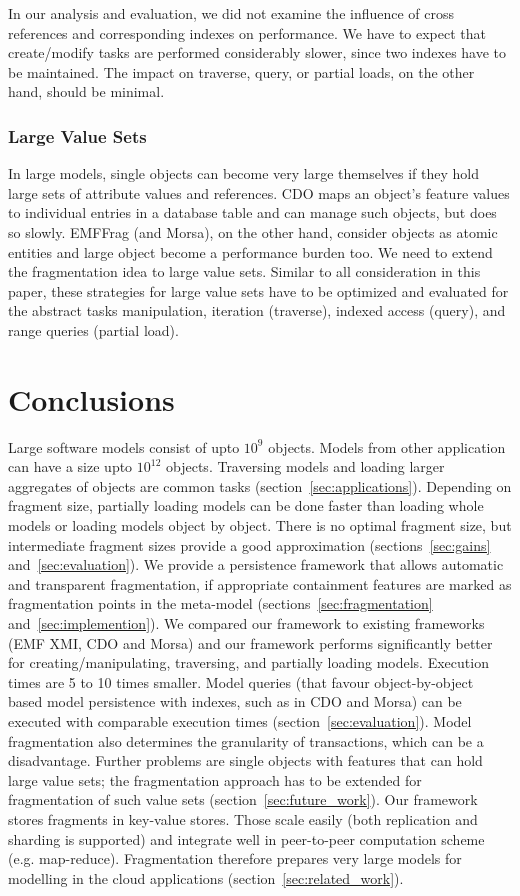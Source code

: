 In our analysis and evaluation, we did not examine the influence of cross references and corresponding indexes on performance. We have to expect that create/modify tasks are performed considerably slower, since two indexes have to be maintained. The impact on traverse, query, or partial loads, on the other hand, should be minimal.

\subsubsection{Large Value Sets}

In large models, single objects can become very large themselves if they hold large sets of attribute values and references. CDO maps an object's feature values to individual entries in a database table and can manage such objects, but does so slowly. EMFFrag (and Morsa), on the other hand, consider objects as atomic entities and large object become a performance burden too. We need to extend the fragmentation idea to large value sets. Similar to all consideration in this paper, these strategies for large value sets have to be optimized and evaluated for the abstract tasks manipulation, iteration (traverse), indexed access (query), and range queries (partial load). 

\section{Conclusions}\label{sec:conclusions}

Large software models consist of upto $10^9$ objects. Models from other application can have a size upto $10^{12}$ objects. Traversing models and loading larger aggregates of objects are common tasks (section~\ref{sec:applications}). Depending on fragment size, partially loading models can be done faster than loading whole models or loading models object by object. There is no optimal fragment size, but intermediate fragment sizes provide a good approximation  (sections~\ref{sec:gains} and~\ref{sec:evaluation}). We provide a persistence framework that allows automatic and transparent fragmentation, if appropriate containment features are marked as fragmentation points in the meta-model (sections~\ref{sec:fragmentation} and~\ref{sec:implemention}). We compared our framework to existing frameworks (EMF XMI, CDO and Morsa) and our framework performs significantly better for creating/manipulating, traversing, and partially loading models. Execution times are 5 to 10 times smaller. Model queries (that favour object-by-object based model persistence with indexes, such as in CDO and Morsa) can be executed with comparable execution times (section~\ref{sec:evaluation}). Model fragmentation also determines the granularity of transactions, which can be a disadvantage. Further problems are single objects with features that can hold large value sets; the fragmentation approach has to be extended for fragmentation of such value sets (section~\ref{sec:future_work}). Our framework stores fragments in key-value stores. Those scale easily (both replication and sharding is supported) and integrate well in peer-to-peer computation scheme (e.g. map-reduce). Fragmentation therefore prepares very large models for modelling in the cloud applications (section~\ref{sec:related_work}).